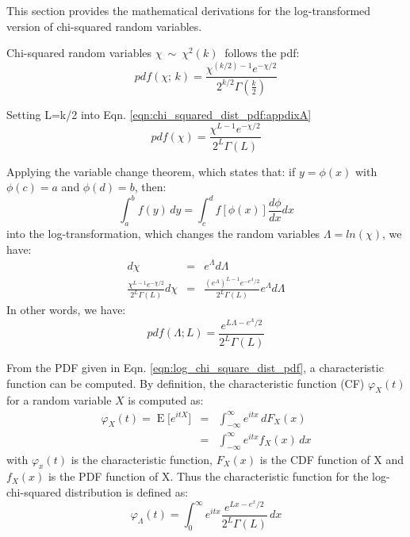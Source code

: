 \documentclass[journal]{IEEEtran}
\begin{document}
This section provides the mathematical derivations for the log-transformed version of chi-squared random variables.

Chi-squared random variables $\chi\ \sim\ \chi^2(k)\ $ follows the pdf:
\begin{equation}
pdf(\chi;\,k) =
  \frac{\chi^{(k/2)-1} e^{-\chi/2}}{2^{k/2} \Gamma\left(\frac{k}{2}\right)}  
\label{eqn:chi_squared_dist_pdf:appdixA}
\end{equation}

Setting L=k/2 into Eqn. \ref{eqn:chi_squared_dist_pdf:appdixA}
\begin{equation}
pdf(\chi) = \frac{\chi^{L-1}e^{-\chi/2}}{2^L\Gamma(L)}
\end{equation}

Applying the variable change theorem, which states that: if $y=\phi(x)$ with $\phi(c)=a$ and $\phi(d)=b$, then:
\begin{equation}
 \int_a^b \! f(y) \, dy = \int_c^d \! f[\phi(x)] \frac{d\phi}{dx} dx
\end{equation}
into the log-transformation, which changes the random variables $\Lambda=ln(\chi)$, we have:
\begin{eqnarray*}
  d\chi &=& e^\Lambda d\Lambda \\
  \frac{\chi^{L-1}e^{-\chi/2}}{2^L\Gamma(L)} d\chi &=&  \frac{(e^\Lambda)^{L-1}e^{-e^\Lambda/2}}{2^L\Gamma(L)} e^\Lambda d\Lambda
\end{eqnarray*}
In other words, we have:
\begin{equation}
pdf(\Lambda;L) = \frac{e^{L \Lambda -e^\Lambda/2}}{2^L\Gamma(L)}
\label{eqn:log_chi_square_dist_pdf}
\end{equation}

From the PDF given in Eqn. \ref{eqn:log_chi_square_dist_pdf}, a characteristic function can be computed.
By definition, the characteristic function (CF) $\varphi_X(t)$ for a random variable $X$ is computed as:
\begin{eqnarray*}
\varphi_X(t) = \operatorname{E}\big[e^{itX}\big] 
      &=& \int_{-\infty}^\infty e^{itx}\,dF_X(x) \\ 
      &=& \int_{-\infty}^\infty e^{itx} f_X(x)\,dx 
\end{eqnarray*}
with $\varphi_x(t)$ is the characteristic function,
     $F_X(x)$ is the CDF function of X and
     $f_X(x)$ is the PDF function of X.
Thus the characteristic function for the log-chi-squared distribution is defined as: 
\begin{equation}
\varphi_\Lambda(t)=\int_0^\infty e^{itx} \frac{e^{Lx-e^x/2}}{2^L \Gamma(L)}\,dx 
\end{equation}
\end{document}
